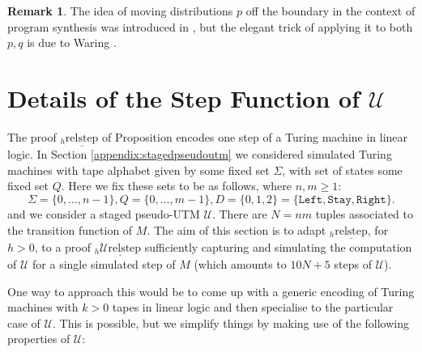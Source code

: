 \documentclass[english,letter paper,12pt,reqno]{article}
\theoremstyle{definition}
\newtheorem{remark}[theorem]{Remark}
\begin{document}
\begin{remark}
The idea of moving distributions $p$ off the boundary in the context of program synthesis was introduced in \cite{clift2018derivatives}, but the elegant trick of applying it to both $p,q$ is due to Waring \cite{waring2021geometric}.
\end{remark}


\section{Details of the Step Function of $\mathcal{U}$}
\label{section:multi_tape}

The proof ${}_h\underline{\text{relstep}}$ of Proposition \cite[5.5]{clift2020encodings} encodes one step of a Turing machine in linear logic. In Section \ref{appendix:stagedpseudoutm} we considered simulated Turing machines with tape alphabet given by some fixed set $\Sigma$, with set of states some fixed set $Q$. Here we fix these sets to be as follows, where $n,m \geq 1$:
\begin{equation}
\label{eq:simulated_machines}
    \Sigma = \{0,\ldots, n-1\}, Q = \{0,\ldots, m-1\}, D = \{0,1,2\} = \{\texttt{Left}, \texttt{Stay}, \texttt{Right}\}.
\end{equation}
and we consider a staged pseudo-UTM $\mathcal{U}$. There are $N = nm$ tuples associated to the transition function of $M$. The aim of this section is to adapt ${}_h\underline{\text{relstep}}$, for $h > 0$, to a proof ${}_h\underline{\text{$\mathcal{U}$relstep}}$ sufficiently capturing and simulating the computation of $\mathcal{U}$ for a single simulated step of $M$ (which amounts to $10N+5$ steps of $\mathcal{U}$).

One way to approach this would be to come up with a generic encoding of Turing machines with $k > 0$ tapes in linear logic and then specialise to the particular case of $\mathcal{U}$. This is possible, but we simplify things by making use of the following properties of $\mathcal{U}$:
\end{document}
